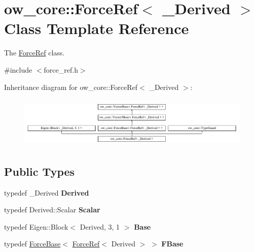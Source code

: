 \hypertarget{classow__core_1_1ForceRef}{}\section{ow\+\_\+core\+:\+:Force\+Ref$<$ \+\_\+\+Derived $>$ Class Template Reference}
\label{classow__core_1_1ForceRef}


The \hyperlink{classow__core_1_1ForceRef}{Force\+Ref} class.  




{\ttfamily \#include $<$force\+\_\+ref.\+h$>$}

Inheritance diagram for ow\+\_\+core\+:\+:Force\+Ref$<$ \+\_\+\+Derived $>$\+:\begin{figure}[H]
\begin{center}
\leavevmode
\includegraphics[height=2.480620cm]{d8/d3c/classow__core_1_1ForceRef}
\end{center}
\end{figure}
\subsection*{Public Types}
\begin{DoxyCompactItemize}
\item 
typedef \+\_\+\+Derived {\bfseries Derived}\hypertarget{classow__core_1_1ForceRef_a3f6e6ffbeb09f4aa9f9bb0708ea78413}{}\label{classow__core_1_1ForceRef_a3f6e6ffbeb09f4aa9f9bb0708ea78413}

\item 
typedef Derived\+::\+Scalar {\bfseries Scalar}\hypertarget{classow__core_1_1ForceRef_aa2a588505879857a9133958c3f74e289}{}\label{classow__core_1_1ForceRef_aa2a588505879857a9133958c3f74e289}

\item 
typedef Eigen\+::\+Block$<$ Derived, 3, 1 $>$ {\bfseries Base}\hypertarget{classow__core_1_1ForceRef_a558b26ede4eb695e423229c982c002f0}{}\label{classow__core_1_1ForceRef_a558b26ede4eb695e423229c982c002f0}

\item 
typedef \hyperlink{classow__core_1_1ForceBase}{Force\+Base}$<$ \hyperlink{classow__core_1_1ForceRef}{Force\+Ref}$<$ Derived $>$ $>$ {\bfseries F\+Base}\hypertarget{classow__core_1_1ForceRef_a328461cb66e2f3213ab8ecc1b7b694cd}{}\label{classow__core_1_1ForceRef_a328461cb66e2f3213ab8ecc1b7b694cd}

\end{DoxyCompactItemize}
